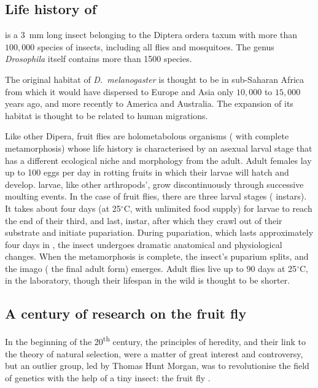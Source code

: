 \subsection{Life history of \dmel{}}

\dmel{} is a 3~mm long insect belonging to the Diptera order\emd{}a taxum with more than $100,000$ species of insects, including all flies and mosquitoes\cite{mayhew_why_2007}. 
The genus \emph{Drosophila} itself contains more than 1500 species\cite{pelandakis_molecular_1993}. 

The original habitat of \emph{D.~melanogaster} is thought to be in sub-Saharan Africa from which it would have dispersed to Europe and Asia only $10,000$ to $15,000$ years ago, and more recently to America and Australia. 
The expansion of its habitat is thought to be related to human migrations\cite{markow_natural_2015}.

Like other Dipera, fruit flies are holometabolous organisms (\ie{} with complete metamorphosis) whose life history is characterised by an asexual larval stage that has a different ecological niche and morphology from the adult.
Adult females lay up to 100 eggs per day in rotting fruits in which their larvae will hatch and develop.
\dmel{} larvae, like other arthropods', grow discontinuously through successive moulting events.
In the case of fruit flies, there are three larval stages (\ie{} instars).
It takes about four days (at 25$^{\circ}$C, with unlimited food supply) for larvae to reach the end of their third, and last, instar, after which they
crawl out of their substrate and initiate pupariation.
During pupariation, which lasts approximately four days in \dmel, the insect undergoes dramatic anatomical and physiological changes. 
When the metamorphosis is complete, the insect's puparium splits, and the imago (\ie{} the final adult form) emerges.
Adult flies live up to 90 days at 25$^{\circ}$C, in the laboratory, though their lifespan in the wild is thought to be shorter\cite{wit_laboratory_2013}.


\subsection{A century of research on the fruit fly}

In the beginning of the 20\textsuperscript{th} century, the principles of heredity, and their link to the theory of natural selection, were 
a matter of great interest and controversy, but an outlier group, led by Thomas Hunt Morgan, was to revolutionise the field of genetics with the help of a tiny insect: the fruit fly \dmel{}.

